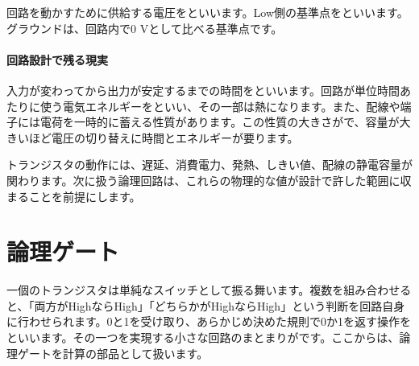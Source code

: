         回路を動かすために供給する電圧をといいます。Low側の基準点をといいます。グラウンドは、回路内で0 Vとして比べる基準点です。

\paragraph{回路設計で残る現実}
        入力が変わってから出力が安定するまでの時間をといいます。回路が単位時間あたりに使う電気エネルギーをといい、その一部は熱になります。また、配線や端子には電荷を一時的に蓄える性質があります。この性質の大きさがで、容量が大きいほど電圧の切り替えに時間とエネルギーが要ります。

        トランジスタの動作には、遅延、消費電力、発熱、しきい値、配線の静電容量が関わります。次に扱う論理回路は、これらの物理的な値が設計で許した範囲に収まることを前提にします。

\par
\endgroup
\par
\endgroup


\section{論理ゲート}
\label{sec:01-digital-computer-06}

一個のトランジスタは単純なスイッチとして振る舞います。複数を組み合わせると、「両方がHighならHigh」「どちらかがHighならHigh」という判断を回路自身に行わせられます。0と1を受け取り、あらかじめ決めた規則で0か1を返す操作をといいます。その一つを実現する小さな回路のまとまりがです。ここからは、論理ゲートを計算の部品として扱います。

